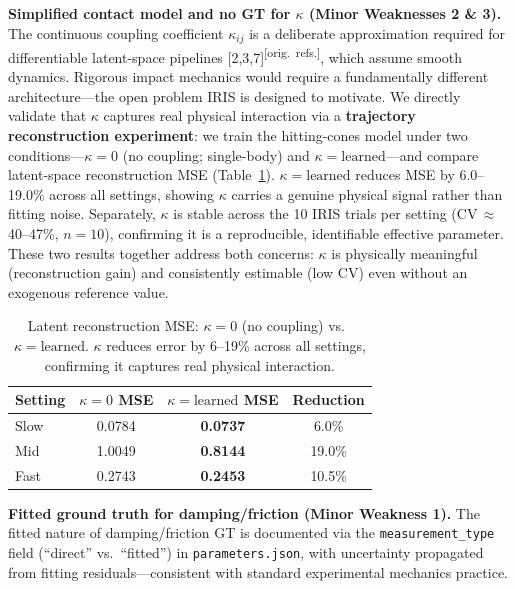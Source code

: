 \documentclass[10pt,twocolumn,letterpaper]{article}
\newcommand{\origref}{\textsuperscript{\normalfont\scriptsize[orig.\ refs.]}}
\begin{document}
\noindent\textbf{Simplified contact model and no GT for $\kappa$ (Minor Weaknesses 2 \& 3).}
The continuous coupling coefficient $\kappa_{ij}$ is a deliberate approximation required for differentiable latent-space pipelines [2,3,7]\origref{}, which assume smooth dynamics. Rigorous impact mechanics would require a fundamentally different architecture—the open problem IRIS is designed to motivate. We directly validate that $\kappa$ captures real physical interaction via a \textbf{trajectory reconstruction experiment}: we train the hitting-cones model under two conditions—$\kappa{=}0$ (no coupling; single-body) and $\kappa{=}\text{learned}$—and compare latent-space reconstruction MSE (Table~\ref{tab:kappa_ablation}). $\kappa{=}\text{learned}$ reduces MSE by 6.0--19.0\% across all settings, showing $\kappa$ carries a genuine physical signal rather than fitting noise. Separately, $\kappa$ is stable across the 10 IRIS trials per setting (CV\,$\approx$\,40--47\%, $n{=}10$), confirming it is a reproducible, identifiable effective parameter. These two results together address both concerns: $\kappa$ is physically meaningful (reconstruction gain) and consistently estimable (low CV) even without an exogenous reference value.

\begin{table}[h]
\centering
\caption{Latent reconstruction MSE: $\kappa{=}0$ (no coupling) vs.\ $\kappa{=}\text{learned}$. $\kappa$ reduces error by 6--19\% across all settings, confirming it captures real physical interaction.}
\label{tab:kappa_ablation}
\small\setlength{\tabcolsep}{4pt}
\begin{tabular}{@{}lccc@{}}
\toprule
Setting & $\kappa{=}0$ MSE & $\kappa{=}\text{learned}$ MSE & Reduction \\
\midrule
Slow & 0.0784 & \textbf{0.0737} & 6.0\% \\
Mid  & 1.0049 & \textbf{0.8144} & 19.0\% \\
Fast & 0.2743 & \textbf{0.2453} & 10.5\% \\
\bottomrule
\end{tabular}
\end{table}

\noindent\textbf{Fitted ground truth for damping/friction (Minor Weakness 1).}
The fitted nature of damping/friction GT is documented via the \texttt{measurement\_type} field (``direct'' vs.\ ``fitted'') in \texttt{parameters.json}, with uncertainty propagated from fitting residuals—consistent with standard experimental mechanics practice.

\end{document}
